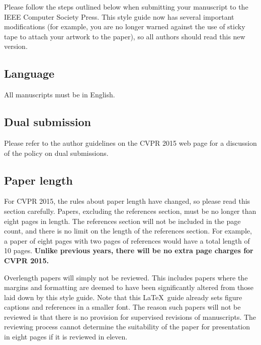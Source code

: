 \documentclass[10pt,twocolumn,letterpaper]{article}
\begin{document}
Please follow the steps outlined below when submitting your manuscript to
the IEEE Computer Society Press.  This style guide now has several
important modifications (for example, you are no longer warned against the
use of sticky tape to attach your artwork to the paper), so all authors
should read this new version.

\subsection{Language}

All manuscripts must be in English.

\subsection{Dual submission}

Please refer to the author guidelines on the CVPR 2015 web page for a
discussion of the policy on dual submissions.

\subsection{Paper length}
For CVPR 2015, the rules about paper length have changed, so please
read this section carefully. Papers, excluding the references section,
must be no longer than eight pages in length. The references section
will not be included in the page count, and there is no limit on the
length of the references section. For example, a paper of eight pages
with two pages of references would have a total length of 10 pages.
{\bf Unlike previous years, there will be no extra page charges for
  CVPR 2015.}

Overlength papers will simply not be reviewed.  This includes papers
where the margins and formatting are deemed to have been significantly
altered from those laid down by this style guide.  Note that this
\LaTeX\ guide already sets figure captions and references in a smaller font.
The reason such papers will not be reviewed is that there is no provision for
supervised revisions of manuscripts.  The reviewing process cannot determine
the suitability of the paper for presentation in eight pages if it is
reviewed in eleven.  

\end{document}
